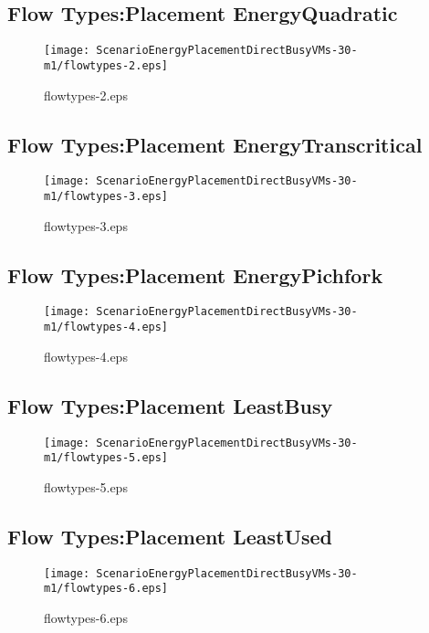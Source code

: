 \documentclass{elsart}
\begin{document}
\clearpage
\subsection{Flow Types:Placement EnergyQuadratic}

\begin{figure}[ht]
\centering
\texttt{[image: ScenarioEnergyPlacementDirectBusyVMs-30-m1/flowtypes-2.eps]}
\caption{flowtypes-2.eps}\label{fig:flowtypes-2}
\end{figure}

\clearpage
\subsection{Flow Types:Placement EnergyTranscritical}

\begin{figure}[ht]
\centering
\texttt{[image: ScenarioEnergyPlacementDirectBusyVMs-30-m1/flowtypes-3.eps]}
\caption{flowtypes-3.eps}\label{fig:flowtypes-3}
\end{figure}

\clearpage
\subsection{Flow Types:Placement EnergyPichfork}

\begin{figure}[ht]
\centering
\texttt{[image: ScenarioEnergyPlacementDirectBusyVMs-30-m1/flowtypes-4.eps]}
\caption{flowtypes-4.eps}\label{fig:flowtypes-4}
\end{figure}

\clearpage
\subsection{Flow Types:Placement LeastBusy}

\begin{figure}[ht]
\centering
\texttt{[image: ScenarioEnergyPlacementDirectBusyVMs-30-m1/flowtypes-5.eps]}
\caption{flowtypes-5.eps}\label{fig:flowtypes-5}
\end{figure}

\clearpage
\subsection{Flow Types:Placement LeastUsed}

\begin{figure}[ht]
\centering
\texttt{[image: ScenarioEnergyPlacementDirectBusyVMs-30-m1/flowtypes-6.eps]}
\caption{flowtypes-6.eps}\label{fig:flowtypes-6}
\end{figure}
\end{document}
